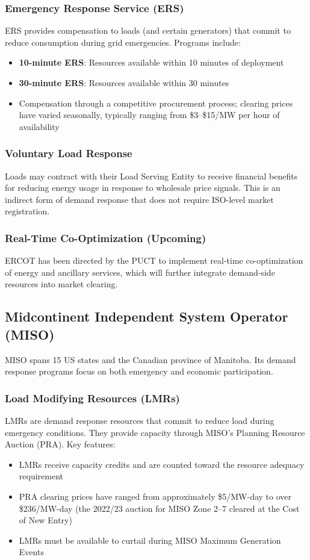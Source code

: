 \documentclass[12pt]{article}
\begin{document}
\subsubsection{Emergency Response Service (ERS)}
ERS provides compensation to loads (and certain generators) that commit to reduce consumption during grid emergencies. Programs include:
\begin{itemize}
    \item \textbf{10-minute ERS}: Resources available within 10 minutes of deployment
    \item \textbf{30-minute ERS}: Resources available within 30 minutes
    \item Compensation through a competitive procurement process; clearing prices have varied seasonally, typically ranging from \$3--\$15/MW per hour of availability
\end{itemize}

\subsubsection{Voluntary Load Response}
Loads may contract with their Load Serving Entity to receive financial benefits for reducing energy usage in response to wholesale price signals. This is an indirect form of demand response that does not require ISO-level market registration.

\subsubsection{Real-Time Co-Optimization (Upcoming)}
ERCOT has been directed by the PUCT to implement real-time co-optimization of energy and ancillary services, which will further integrate demand-side resources into market clearing.

\subsection{Midcontinent Independent System Operator (MISO)}

MISO spans 15 US states and the Canadian province of Manitoba. Its demand response programs focus on both emergency and economic participation.

\subsubsection{Load Modifying Resources (LMRs)}
LMRs are demand response resources that commit to reduce load during emergency conditions. They provide capacity through MISO's Planning Resource Auction (PRA). Key features:
\begin{itemize}
    \item LMRs receive capacity credits and are counted toward the resource adequacy requirement
    \item PRA clearing prices have ranged from approximately \$5/MW-day to over \$236/MW-day (the 2022/23 auction for MISO Zone 2--7 cleared at the Cost of New Entry)
    \item LMRs must be available to curtail during MISO Maximum Generation Events
\end{itemize}
\end{document}
